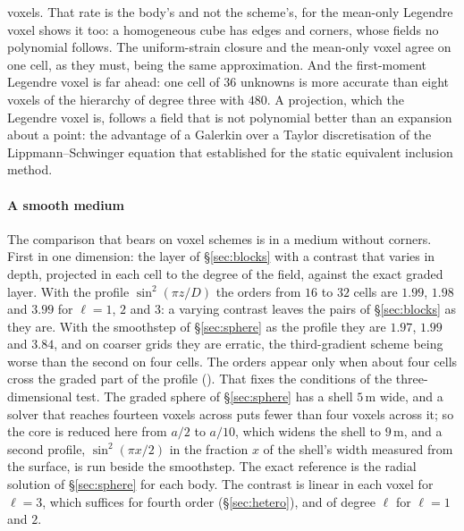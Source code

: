 \documentclass[preprint,review,12pt]{elsarticle}
\begin{document}
voxels. That rate is the body's and not the scheme's, for the mean-only Legendre voxel shows it too: a
homogeneous cube has edges and corners, whose fields no polynomial follows. The uniform-strain closure
and the mean-only voxel agree on one cell, as they must, being the same approximation. And the
first-moment Legendre voxel is far ahead: one cell of $36$ unknowns is more accurate than eight voxels
of the hierarchy of degree three with $480$. A projection, which the Legendre voxel is, follows a field
that is not polynomial better than an expansion about a point: the advantage of a Galerkin over a Taylor
discretisation of the Lippmann--Schwinger equation that \citet{Brisard2014} established for the static
equivalent inclusion method.

\paragraph{A smooth medium} The comparison that bears on voxel schemes is in a medium without corners.
First in one dimension: the layer of \S\ref{sec:blocks} with a contrast that varies in depth, projected
in each cell to the degree of the field, against the exact graded layer. With the profile
$\sin^2(\pi z/D)$ the orders from $16$ to $32$ cells are $1.99$, $1.98$ and $3.99$ for $\ell=1$, $2$
and $3$: a varying contrast leaves the pairs of \S\ref{sec:blocks} as they are. With the smoothstep of
\S\ref{sec:sphere} as the profile they are $1.97$, $1.99$ and $3.84$, and on coarser grids they are
erratic, the third-gradient scheme being worse than the second on four cells. The orders appear only
when about four cells cross the graded part of the profile
(). That fixes the conditions of the
three-dimensional test. The graded sphere of \S\ref{sec:sphere} has a shell $5$\,m wide, and a solver
that reaches fourteen voxels across puts fewer than four voxels across it; so the core is reduced here
from $a/2$ to $a/10$, which widens the shell to $9$\,m, and a second profile, $\sin^2(\pi x/2)$ in the
fraction $x$ of the shell's width measured from the surface, is run beside the smoothstep. The exact
reference is the radial solution of \S\ref{sec:sphere} for each body. The contrast is linear in each
voxel for $\ell=3$, which suffices for fourth order (\S\ref{sec:hetero}), and of degree $\ell$ for
$\ell=1$ and $2$.
\end{document}
